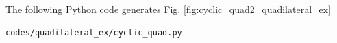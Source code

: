 \begin{enumerate}[label=\thesubsection.\arabic*.,ref=\thesubsection.\theenumi]
The following Python code generates Fig. \ref{fig:cyclic_quad2_quadilateral_ex}

\begin{lstlisting}
codes/quadilateral_ex/cyclic_quad.py
\end{lstlisting}
\end{enumerate}




